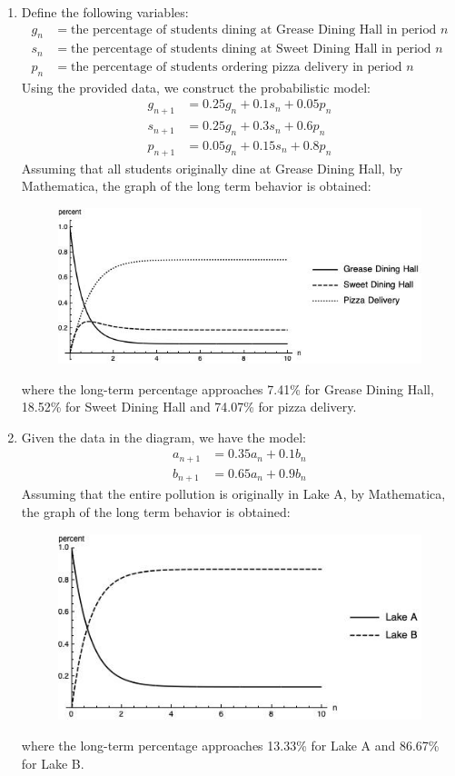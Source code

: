 \documentclass[10pt]{report}
\begin{document}
\begin{enumerate}
	\item 
	Define the following variables:
	\begin{align*}
		g_n &= \text{the percentage of students dining at Grease Dining Hall in period $n$}\\
		s_n &= \text{the percentage of students dining at Sweet Dining Hall in period $n$}\\
		p_n &= \text{the percentage of students ordering pizza delivery in period $n$}
	\end{align*}
	Using the provided data, we construct the probabilistic model:
	\begin{align*}
		g_{n+1} &= 0.25 g_n + 0.1 s_n + 0.05 p_n\\
		s_{n+1} &= 0.25 g_n + 0.3 s_n + 0.6 p_n\\
		p_{n+1} &= 0.05 g_n + 0.15 s_n + 0.8 p_n
	\end{align*}
	Assuming that all students originally dine at Grease Dining Hall, by Mathematica, the graph of the long term behavior is obtained:
	\begin{figure}[H]
		\centering
		\includegraphics[width=0.5\linewidth]{3.jpg}
	\end{figure}
	where the long-term percentage approaches 7.41\% for Grease Dining Hall, 18.52\% for Sweet Dining Hall and 74.07\% for pizza delivery.
	
	\item 
	Given the data in the diagram, we have the model:
	\begin{align*}
		a_{n+1} &= 0.35 a_n + 0.1 b_n\\
		b_{n+1} &= 0.65 a_n + 0.9 b_n
	\end{align*}
	Assuming that the entire pollution is originally in Lake A, by Mathematica, the graph of the long term behavior is obtained:
	\begin{figure}[H]
		\centering
		\includegraphics[width=0.5\linewidth]{4.jpg}
	\end{figure}
	where the long-term percentage approaches 13.33\% for Lake A and 86.67\% for Lake B.
	

\end{enumerate}
\end{document}
